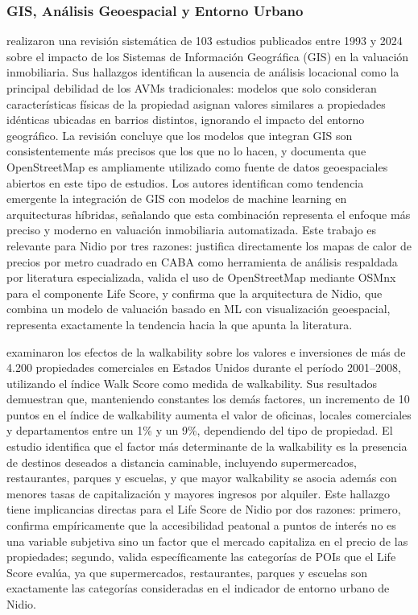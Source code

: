 \subsubsection{GIS, Análisis Geoespacial y Entorno Urbano}

\textcite{DrojEtAl2024} realizaron una revisión sistemática de 103 estudios publicados entre 1993 y 2024 sobre el impacto de los Sistemas de Información Geográfica (GIS) en la valuación inmobiliaria. Sus hallazgos identifican la ausencia de análisis locacional como la principal debilidad de los AVMs tradicionales: modelos que solo consideran características físicas de la propiedad asignan valores similares a propiedades idénticas ubicadas en barrios distintos, ignorando el impacto del entorno geográfico. La revisión concluye que los modelos que integran GIS son consistentemente más precisos que los que no lo hacen, y documenta que OpenStreetMap es ampliamente utilizado como fuente de datos geoespaciales abiertos en este tipo de estudios. Los autores identifican como tendencia emergente la integración de GIS con modelos de machine learning en arquitecturas híbridas, señalando que esta combinación representa el enfoque más preciso y moderno en valuación inmobiliaria automatizada. Este trabajo es relevante para Nidio por tres razones: justifica directamente los mapas de calor de precios por metro cuadrado en CABA como herramienta de análisis respaldada por literatura especializada, valida el uso de OpenStreetMap mediante OSMnx para el componente Life Score, y confirma que la arquitectura de Nidio, que combina un modelo de valuación basado en ML con visualización geoespacial, representa exactamente la tendencia hacia la que apunta la literatura.

\textcite{PivoFisher2011} examinaron los efectos de la walkability sobre los valores e inversiones de más de 4.200 propiedades comerciales en Estados Unidos durante el período 2001--2008, utilizando el índice Walk Score como medida de walkability. Sus resultados demuestran que, manteniendo constantes los demás factores, un incremento de 10 puntos en el índice de walkability aumenta el valor de oficinas, locales comerciales y departamentos entre un 1\% y un 9\%, dependiendo del tipo de propiedad. El estudio identifica que el factor más determinante de la walkability es la presencia de destinos deseados a distancia caminable, incluyendo supermercados, restaurantes, parques y escuelas, y que mayor walkability se asocia además con menores tasas de capitalización y mayores ingresos por alquiler. Este hallazgo tiene implicancias directas para el Life Score de Nidio por dos razones: primero, confirma empíricamente que la accesibilidad peatonal a puntos de interés no es una variable subjetiva sino un factor que el mercado capitaliza en el precio de las propiedades; segundo, valida específicamente las categorías de POIs que el Life Score evalúa, ya que supermercados, restaurantes, parques y escuelas son exactamente las categorías consideradas en el indicador de entorno urbano de Nidio.

